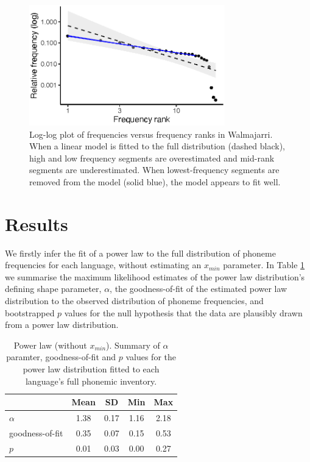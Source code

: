 \begin{figure}

{\centering \includegraphics[width=85mm]{03-phoneme-frequencies/fig/Fig2_walmajarri_lm} 

}

\caption[Log-log plot of frequencies versus frequency ranks in Walmajarri]{Log-log plot of frequencies versus frequency ranks in Walmajarri. When a linear model is fitted to the full distribution (dashed black), high and low frequency segments are overestimated and mid-rank segments are underestimated. When lowest-frequency segments are removed from the model (solid blue), the model appears to fit well.}\label{fig:Figure-2}
\end{figure}

\hypertarget{phon-freq-results}{%
\section{Results}\label{phon-freq-results}}

We firstly infer the fit of a power law to the full distribution of phoneme frequencies for each language, without estimating an \(x_{min}\) parameter. In Table \ref{tab:pl-summary} we summarise the maximum likelihood estimates of the power law distribution's defining shape parameter, \(\alpha\), the goodness-of-fit of the estimated power law distribution to the observed distribution of phoneme frequencies, and bootstrapped \(p\) values for the null hypothesis that the data are plausibly drawn from a power law distribution.

\begin{table}

\caption[Power law (without $x_{min}$)]{\label{tab:pl-summary}Power law (without $x_{min}$). Summary of $\alpha$ paramter, goodness-of-fit and $p$ values for the power law distribution fitted to each language's full phonemic inventory.}
\centering
\begin{tabular}[t]{lcccc}
\toprule
\textbf{ } & \textbf{Mean} & \textbf{SD} & \textbf{Min} & \textbf{Max}\\
\midrule
$\alpha$ & 1.38 & 0.17 & 1.16 & 2.18\\
goodness-of-fit & 0.35 & 0.07 & 0.15 & 0.53\\
$p$ & 0.01 & 0.03 & 0.00 & 0.27\\
\bottomrule
\end{tabular}
\end{table}

